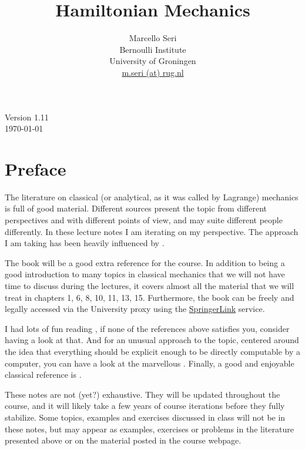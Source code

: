 \documentclass[english,fontsize=11pt,paper=b5]{scrbook}
\title{Hamiltonian Mechanics}
\author{Marcello Seri\\
  \small{Bernoulli Institute}\vspace{-.2cm}\\
  \small{University of Groningen}\vspace{-.2cm}\\
  \small\href{mailto:m.seri@rug.nl}{m.seri (at) rug.nl}
}
\date{}
\theoremstyle{definition}
\begin{document}
\maketitle

\cleardoublepage

\thispagestyle{empty}
\null\vfill
\begin{center}
  Version 1.11\\
  \today
\end{center}
\begin{warpprint}
  \vfill
  \small{\doclicenseThis}
\end{warpprint}
\cleardoublepage

\tableofcontents

\cleardoublepage

\chapter*{Preface}

The literature on classical (or analytical, as it was called by Lagrange) mechanics is full of good material.
Different sources present the topic from different perspectives and with different points of view, and may suite different people differently.
In these lecture notes I am iterating on my perspective.
The approach I am taking has been heavily influenced by \cite{book:arnold, book:knauf, lectures:dubrovin, book:lowenstein, book:marsdenratiu, lectures:tong, landau1976mechanics}.

The book \cite{book:knauf} will be a good extra reference for the course. In addition to being a good introduction to many topics in classical mechanics that we will not have time to discuss during the lectures, it covers almost all the material that we will treat in chapters 1, 6, 8, 10, 11, 13, 15. Furthermore, the book can be freely and legally accessed via the University proxy using the \href{https://link.springer.com/book/10.1007%2F978-3-662-55774-7}{SpringerLink} service.

  I had lots of fun reading \cite{schwichtenberg2019no}, if none of the references above satisfies you, consider having a look at that. And for an unusual approach to the topic, centered around the idea that everything should be explicit enough to be directly computable by a computer, you can have a look at the marvellous \cite{book:sicm}. Finally, a good and enjoyable classical reference is \cite{goldstein2013classical}.\medskip

  These notes are not (yet?) exhaustive.
  They will be updated throughout the course, and it will likely take a few years of course iterations before they fully stabilize.
  Some topics, examples and exercises discussed in class will not be in these notes, but may appear as examples, exercises or problems in the literature presented above or on the material posted in the course webpage.
\end{document}
